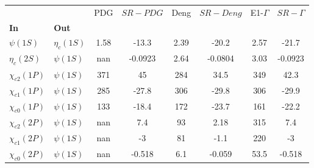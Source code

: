 \begin{tabular}{l|l|c|c|c|c|c|c}
\toprule
                &            &  PDG & $SR-PDG$ &  Deng & $SR-Deng$ &  E1-$\Gamma$ & $SR-\Gamma$ \\
\textbf{In} & \textbf{Out} &      &          &       &           &              &             \\
\midrule
\textbf{$\psi(1S)$} & \textbf{$\eta_{c}(1S)$} & 1.58 &    -13.3 &  2.39 &     -20.2 &         2.57 &       -21.7 \\
\textbf{$\eta_{c}(2S)$} & \textbf{$\psi(1S)$} &  nan &  -0.0923 &  2.64 &   -0.0804 &         3.03 &     -0.0923 \\
\textbf{$\chi_{c2}(1P)$} & \textbf{$\psi(1S)$} &  371 &       45 &   284 &      34.5 &          349 &        42.3 \\
\textbf{$\chi_{c1}(1P)$} & \textbf{$\psi(1S)$} &  285 &    -27.8 &   306 &     -29.8 &          306 &       -29.9 \\
\textbf{$\chi_{c0}(1P)$} & \textbf{$\psi(1S)$} &  133 &    -18.4 &   172 &     -23.7 &          161 &       -22.2 \\
\textbf{$\chi_{c2}(2P)$} & \textbf{$\psi(1S)$} &  nan &      7.4 &    93 &      2.18 &          315 &         7.4 \\
\textbf{$\chi_{c1}(2P)$} & \textbf{$\psi(1S)$} &  nan &       -3 &    81 &      -1.1 &          220 &          -3 \\
\textbf{$\chi_{c0}(2P)$} & \textbf{$\psi(1S)$} &  nan &   -0.518 &   6.1 &    -0.059 &         53.5 &      -0.518 \\
\bottomrule
\end{tabular}
